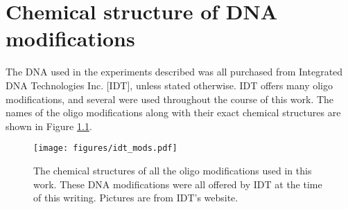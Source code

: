 \chapter{Chemical structure of DNA modifications}
\label{idt_dna}

The DNA used in the experiments described was all purchased from Integrated DNA Technologies Inc. [IDT], unless stated otherwise.  IDT offers many oligo modifications, and several were used throughout the course of this work.  The names of the oligo modifications along with their exact chemical structures are shown in Figure \ref{fig:idt_mods}.

\begin{figure}[h]
\begin{centering}
\texttt{[image: figures/idt\_mods.pdf]}
\caption[Oligo modifications used in this work]{The chemical structures of all the oligo modifications used in this work.  These DNA modifications were all offered by IDT at the time of this writing.  Pictures are from IDT's website.}
\label{fig:idt_mods}
\end{centering}
\end{figure}